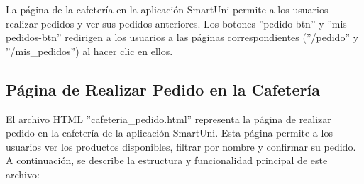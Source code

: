 \documentclass[12pt]{report}
\begin{document}
 La página de la cafetería en la aplicación SmartUni permite a los usuarios realizar pedidos y ver sus pedidos anteriores. Los botones ''pedido-btn'' y ''mis-pedidos-btn'' redirigen a los usuarios a las páginas correspondientes (''/pedido'' y ''/mis\_pedidos'') al hacer clic en ellos.

 \subsection{Página de Realizar Pedido en la Cafetería}
El archivo HTML ''cafeteria\_pedido.html'' representa la página de realizar pedido en la cafetería de la aplicación SmartUni. Esta página permite a los usuarios ver los productos disponibles, filtrar por nombre y confirmar su pedido. A continuación, se describe la estructura y funcionalidad principal de este archivo:
\end{document}
